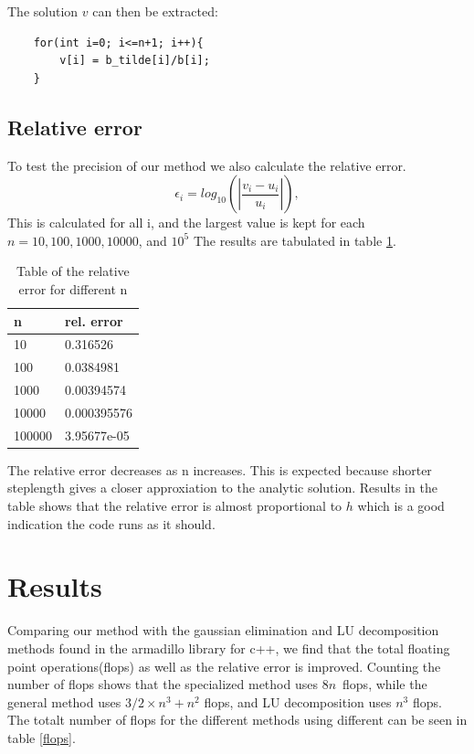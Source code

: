 \documentclass[a4paper,12pt]{article}
\begin{document}
The solution $v$ can then be extracted:
\begin{verbatim}
    for(int i=0; i<=n+1; i++){
        v[i] = b_tilde[i]/b[i];
    }
\end{verbatim}

\subsection{Relative error}
To test the precision of our method we also calculate the relative error.
\[
   \epsilon_i=log_{10}\left(\left|\frac{v_i-u_i}
                 {u_i}\right|\right),
\]
This is calculated for all i, and the largest value is kept for each $n = 10,100,1000,10000$, and $10^5$
The results are tabulated in table \ref{errortable}.


\begin{table}[H]
\begin{center}
\begin{tabular}{ | l | l |}
    \hline
    n      & rel. error \\ 
    \hline
    10     & 0.316526 \\  
    100    & 0.0384981 \\
    1000   & 0.00394574 \\
    10000  & 0.000395576 \\
    100000 & 3.95677e-05  \\
    \hline
\end{tabular}
\caption{Table of the relative error for different n}
\label{errortable}
\end{center}
\end{table}

The relative error decreases as n increases. This is expected because shorter steplength gives a closer approxiation to the analytic solution. Results in the table shows that the relative error is almost proportional to $h$ which is a good indication the code runs as it should.

\section{Results}
Comparing our method with the gaussian elimination and LU decomposition methods found in the armadillo library for c++, we find that the total floating point operations(flops) as well as the relative error is improved.
Counting the number of flops shows that the specialized method uses $8n$ flops, while the general method uses $3/2\times n^3+n^2$ flops, and LU decomposition uses $n^3$ flops. The totalt number of flops for the different methods using different can be seen in table \ref{flops}.
\end{document}
